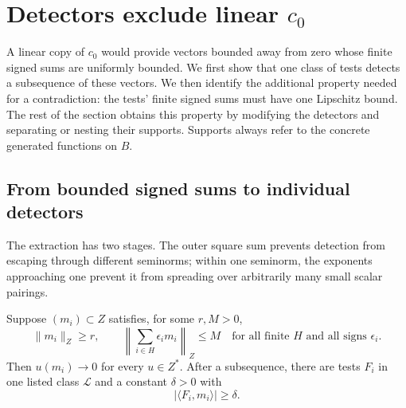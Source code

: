 \section{Detectors exclude linear \texorpdfstring{\(c_0\)}{c0}}\label{sec:no-c0}

A linear copy of \(c_0\) would provide vectors bounded away from zero
whose finite signed sums are uniformly bounded. We first show that
one class of tests detects a subsequence of these vectors. We then
identify the additional property needed for a contradiction: the tests'
finite signed sums must have one Lipschitz bound. The rest of the
section obtains this property by modifying the detectors and separating
or nesting their supports. Supports always refer to the concrete
generated functions on \(B\).

\subsection{From bounded signed sums to individual detectors}

The extraction has two stages. The outer square sum prevents detection
from escaping through different seminorms; within one seminorm, the
exponents approaching one prevent it from spreading over arbitrarily
many small scalar pairings.

\begin{lemma}\label{lem:detectors}
Suppose \((m_i)\subset Z\) satisfies, for some \(r,M>0\),
\begin{equation}
 \|m_i\|_Z\geq r,\qquad
 \left\|\sum_{i\in H}\epsilon_i m_i\right\|_Z\leq M
 \quad\text{for all finite \(H\) and all signs \(\epsilon_i\)}. \label{eq:bounded-signed}
\end{equation}
Then \(u(m_i)\to0\) for every \(u\in Z^*\). After a subsequence,
there are tests \(F_i\) in one listed class \(\mathcal L\) and a
constant \(\delta>0\) with
\begin{equation}
                         |\langle F_i,m_i\rangle|\geq\delta.
                                                               \label{eq:detected}
\end{equation}
\end{lemma}

